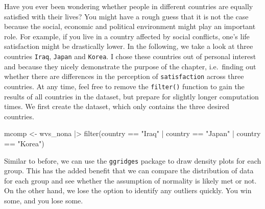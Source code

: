 \documentclass[
  letterpaper,
]{krantz}
\makeatletter
\newenvironment{Shaded}{\begin{snugshade}}{\end{snugshade}}
\newcommand{\FunctionTok}[1]{\textcolor[rgb]{0.28,0.35,0.67}{#1}}
\newcommand{\NormalTok}[1]{\textcolor[rgb]{0.00,0.23,0.31}{#1}}
\newcommand{\OtherTok}[1]{\textcolor[rgb]{0.00,0.23,0.31}{#1}}
\newcommand{\SpecialCharTok}[1]{\textcolor[rgb]{0.37,0.37,0.37}{#1}}
\newcommand{\StringTok}[1]{\textcolor[rgb]{0.13,0.47,0.30}{#1}}
\newenvironment{kframe}{%
\medskip{}
\setlength{\fboxsep}{.8em}
 \def\at@end@of@kframe{}%
 \ifinner\ifhmode%
  \def\at@end@of@kframe{\end{minipage}}%
  \begin{minipage}{\columnwidth}%
 \fi\fi%
 \def\FrameCommand##1{\hskip\@totalleftmargin \hskip-\fboxsep
 \colorbox{shadecolor}{##1}\hskip-\fboxsep
     \hskip-\linewidth \hskip-\@totalleftmargin \hskip\columnwidth}%
 \MakeFramed {\advance\hsize-\width
   \@totalleftmargin\z@ \linewidth\hsize
   \@setminipage}}%
 {\par\unskip\endMakeFramed%
 \at@end@of@kframe}
\renewenvironment{Shaded}{\begin{kframe}}{\end{kframe}}
\makeatother
\begin{document}
Have you ever been wondering whether people in different countries are
equally satisfied with their lives? You might have a rough guess that it
is not the case because the social, economic and political environment
might play an important role. For example, if you live in a country
affected by social conflicts, one's life satisfaction might be
drastically lower. In the following, we take a look at three countries
\texttt{Iraq}, \texttt{Japan} and \texttt{Korea}. I chose these
countries out of personal interest and because they nicely demonstrate
the purpose of the chapter, i.e.~finding out whether there are
differences in the perception of \texttt{satisfaction} across three
countries. At any time, feel free to remove the \texttt{filter()}
function to gain the results of all countries in the dataset, but
prepare for slightly longer computation times. We first create the
dataset, which only contains the three desired countries.

\begin{Shaded}
\begin{Highlighting}[]
\NormalTok{mcomp }\OtherTok{\textless{}{-}}
\NormalTok{  wvs\_nona }\SpecialCharTok{|\textgreater{}}
  \FunctionTok{filter}\NormalTok{(country }\SpecialCharTok{==} \StringTok{"Iraq"} \SpecialCharTok{|}
\NormalTok{           country }\SpecialCharTok{==} \StringTok{"Japan"} \SpecialCharTok{|}
\NormalTok{           country }\SpecialCharTok{==} \StringTok{"Korea"}\NormalTok{)}
\end{Highlighting}
\end{Shaded}

Similar to before, we can use the \texttt{ggridges} package to draw
density plots for each group. This has the added benefit that we can
compare the distribution of data for each group and see whether the
assumption of normality is likely met or not. On the other hand, we lose
the option to identify any outliers quickly. You win some, and you lose
some.
\end{document}

